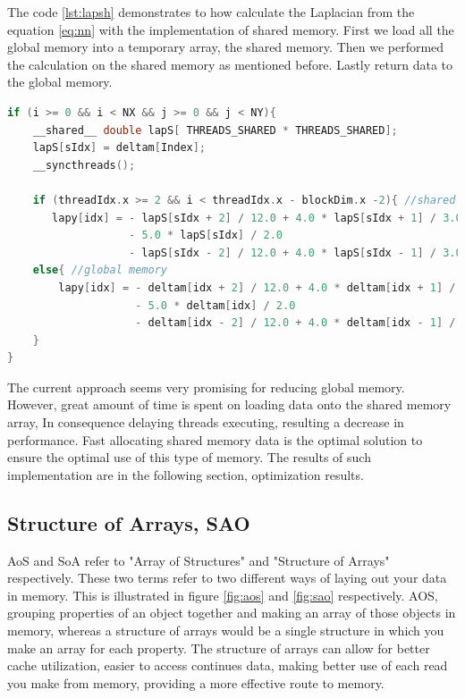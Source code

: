 The code \ref{lst:lapsh} demonstrates to how calculate the Laplacian from the equation \ref{eq:nn} with the implementation of shared memory. First we load all the global memory into a temporary array, the shared memory. Then we performed the calculation on the shared memory as mentioned before. Lastly return data to the global memory.

\begin{lstlisting}[language=C++, label={lst:lapsh}, caption={Laplacian evaluating using shared memory with boundaries condition}]
if (i >= 0 && i < NX && j >= 0 && j < NY){
    __shared__ double lapS[ THREADS_SHARED * THREADS_SHARED];
    lapS[sIdx] = deltam[Index];
    __syncthreads();

    if (threadIdx.x >= 2 && i < threadIdx.x - blockDim.x -2){ //shared
       lapy[idx] = - lapS[sIdx + 2] / 12.0 + 4.0 * lapS[sIdx + 1] / 3.0
			  	   - 5.0 * lapS[sIdx] / 2.0
			  	   - lapS[sIdx - 2] / 12.0 + 4.0 * lapS[sIdx - 1] / 3.0;
	else{ //global memory
		lapy[idx] = - deltam[idx + 2] / 12.0 + 4.0 * deltam[idx + 1] / 3.0
			  		- 5.0 * deltam[idx] / 2.0
			  		- deltam[idx - 2] / 12.0 + 4.0 * deltam[idx - 1] / 3.0;
	}
}
\end{lstlisting}

The current approach seems very promising for reducing global memory. However, great amount of time is spent on loading data onto the shared memory array, In consequence delaying threads executing, resulting a decrease in performance. Fast allocating shared memory data is the optimal solution to ensure the optimal use of this type of memory. The results of such implementation are in the following section, optimization results.

\subsection{Structure of Arrays, SAO}

AoS and SoA refer to "Array of Structures" and "Structure of Arrays" respectively. These two terms refer to two different ways of laying out your data in memory. This is illustrated in figure \ref{fig:aos} and \ref{fig:sao} respectively. AOS, grouping properties of an object together and making an array of those objects in memory, whereas a structure of arrays would be a single structure in which you make an array for each property. The structure of arrays can allow for better cache utilization, easier to access continues data, making better use of each read you make from memory, providing a more effective route to memory. 

